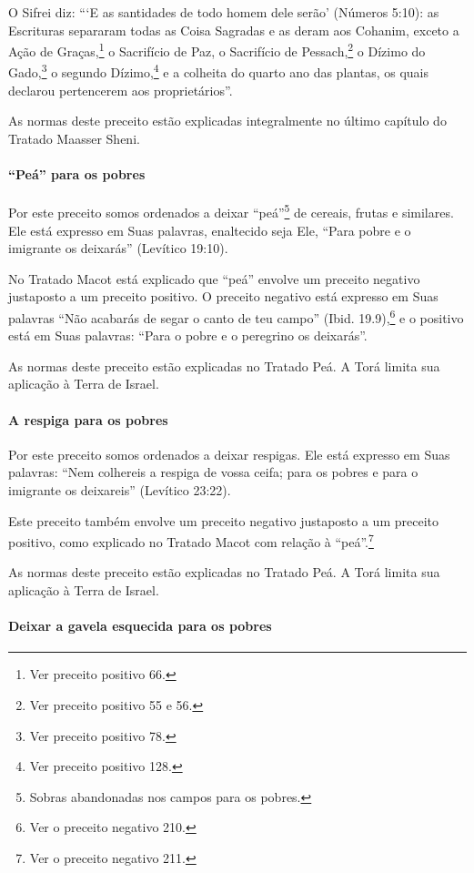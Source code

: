 O Sifrei diz: ```E as santidades de todo homem dele serão' (Números 5:10): as Escrituras separaram todas as Coisa Sagradas e as deram
aos Cohanim, exceto a Ação de Graças,\footnote{Ver preceito positivo 66.} o Sacrifício de Paz, o Sacrifício de Pessach,\footnote{Ver preceito positivo 55 e 56.} o Dízimo do Gado,\footnote{Ver preceito positivo 78.} o segundo Dízimo,\footnote{Ver preceito positivo 128.} e a colheita do quarto ano
das plantas, os quais declarou pertencerem aos proprietários''.

As normas deste preceito estão explicadas integralmente no último
capítulo do Tratado Maasser Sheni.


\paragraph{``Peá'' para os pobres}

Por este preceito somos ordenados a deixar ``peá''\footnote{Sobras abandonadas nos campos para os pobres.}
de cereais, frutas e similares. Ele está expresso em Suas palavras,
enaltecido seja Ele, ``Para pobre e o imigrante os deixarás'' (Levítico 19:10).

No Tratado Macot está explicado que ``peá'' envolve um preceito negativo
justaposto a um preceito positivo. O preceito negativo está expresso
em Suas palavras ``Não acabarás de segar o canto de teu campo'' (Ibid.
19.9),\footnote{Ver o preceito negativo 210.} e o positivo está em Suas palavras: ``Para o pobre e o peregrino os
deixarás''.

As normas deste preceito estão explicadas no Tratado Peá. A Torá limita
sua aplicação à Terra de Israel.

\paragraph{A respiga para os pobres}

Por este preceito somos ordenados a deixar respigas. Ele está expresso
em Suas palavras: ``Nem colhereis a respiga de vossa ceifa; para os
pobres e para o imigrante os deixareis'' (Levítico 23:22).

Este preceito também envolve um preceito negativo justaposto a um
preceito positivo, como explicado no Tratado Macot com relação à
``peá''.\footnote{Ver o preceito negativo 211.}


As normas deste preceito estão explicadas no Tratado Peá. A Torá limita
sua aplicação à Terra de Israel.

\paragraph{Deixar a gavela esquecida para os pobres}

